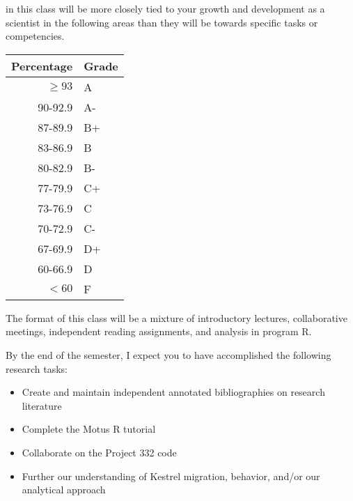 \documentclass{tufte-handout}
\begin{document}

 in this class will be more closely tied to your growth and development as a scientist in the following areas than they will be towards specific tasks or competencies. 

\begin{margintable}
\begin{tabular}{rl}
Percentage & Grade \\
\hline 
$\ge93$ & A \\
90-92.9 & A- \\
87-89.9 & B+ \\
83-86.9 & B \\
80-82.9 & B- \\
77-79.9 & C+ \\
73-76.9 & C \\
70-72.9 & C- \\
67-69.9 & D+ \\
60-66.9 & D \\
$<60$ & F \\
\hline
\end{tabular}
\end{margintable}

The format of this class will be a mixture of introductory lectures, collaborative meetings, independent reading assignments, and analysis in program R. 

By the end of the semester, I expect you to have accomplished the following research tasks:

\begin{itemize}
	\item Create and maintain independent annotated bibliographies on research literature
	\item Complete the Motus R tutorial
	\item Collaborate on the Project 332 code
	\item Further our understanding of Kestrel migration, behavior, and/or our analytical approach 
\end{itemize}
\end{document}
